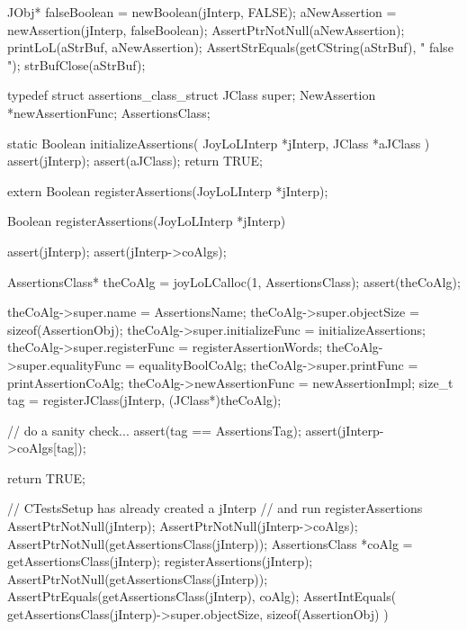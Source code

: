   JObj* falseBoolean = newBoolean(jInterp,   FALSE);
  aNewAssertion      = newAssertion(jInterp, falseBoolean);
  AssertPtrNotNull(aNewAssertion);  
  printLoL(aStrBuf, aNewAssertion);
  AssertStrEquals(getCString(aStrBuf), "{ false } ");
  strBufClose(aStrBuf);
\stopCTest
\stopTestCase
\stopTestSuite

\startTestSuite[registerAssertions]

\startCHeader
typedef struct assertions_class_struct {
  JClass       super;
  NewAssertion      *newAssertionFunc;
} AssertionsClass;

\stopCHeader

\startCCode
static Boolean initializeAssertions(
  JoyLoLInterp *jInterp,
  JClass   *aJClass
) {
  assert(jInterp);
  assert(aJClass);
  return TRUE;
}
\stopCCode

\startCHeader
extern Boolean registerAssertions(JoyLoLInterp *jInterp);
\stopCHeader
{}

\startCCode
Boolean registerAssertions(JoyLoLInterp *jInterp) {
  assert(jInterp);
  assert(jInterp->coAlgs);
  
  AssertionsClass* theCoAlg
    = joyLoLCalloc(1, AssertionsClass);
  assert(theCoAlg);
  
  theCoAlg->super.name           = AssertionsName;
  theCoAlg->super.objectSize     = sizeof(AssertionObj);
  theCoAlg->super.initializeFunc = initializeAssertions;
  theCoAlg->super.registerFunc   = registerAssertionWords;
  theCoAlg->super.equalityFunc   = equalityBoolCoAlg;
  theCoAlg->super.printFunc      = printAssertionCoAlg;
  theCoAlg->newAssertionFunc       = newAssertionImpl;
  size_t tag =
    registerJClass(jInterp, (JClass*)theCoAlg);
  
  // do a sanity check...
  assert(tag == AssertionsTag);
  assert(jInterp->coAlgs[tag]);
   
  return TRUE;
}
\stopCCode


\startCTest
  // CTestsSetup has already created a jInterp
  // and run registerAssertions
  AssertPtrNotNull(jInterp);
  AssertPtrNotNull(jInterp->coAlgs);
  AssertPtrNotNull(getAssertionsClass(jInterp));
  AssertionsClass *coAlg = getAssertionsClass(jInterp);
  registerAssertions(jInterp);
  AssertPtrNotNull(getAssertionsClass(jInterp));
  AssertPtrEquals(getAssertionsClass(jInterp), coAlg);
  AssertIntEquals(
    getAssertionsClass(jInterp)->super.objectSize,
    sizeof(AssertionObj)
  )
\stopCTest
\stopTestCase
\stopTestSuite
